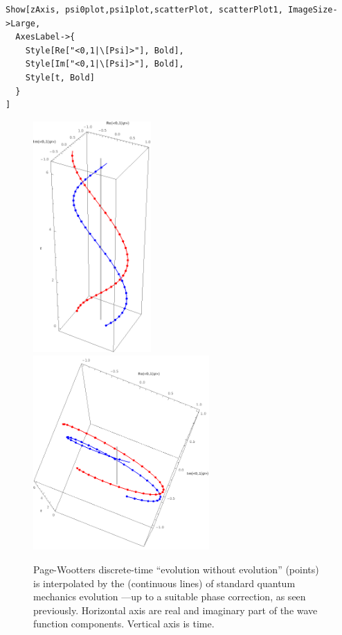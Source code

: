 \begin{Verbatim}
Show[zAxis, psi0plot,psi1plot,scatterPlot, scatterPlot1, ImageSize->Large,
  AxesLabel->{
    Style[Re["<0,1|\[Psi]>"], Bold],
    Style[Im["<0,1|\[Psi]>"], Bold],
    Style[t, Bold]
  }
]
\end{Verbatim}
\begin{figure}[!h]
  \centering
  \includegraphics[width=0.4\textwidth]{img/PWfit32.png}
  \includegraphics[width=0.6\textwidth]{img/PWfit32top.png}
  \caption[(from notebook)]{
    Page-Wootters discrete-time ``evolution without evolution'' (points)
    is interpolated by the (continuous lines) of standard quantum mechanics
    evolution ---up to a suitable phase correction, as seen previously.
    Horizontal axis are real and imaginary part of the wave function components.
    Vertical axis is time. 
  }
\end{figure}
